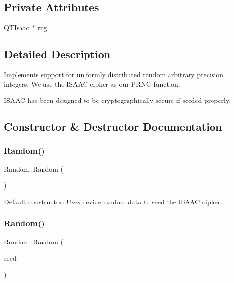 \subsection*{Private Attributes}
\begin{DoxyCompactItemize}
\item 
\hyperlink{classQTIsaac}{Q\+T\+Isaac} $\ast$ \hyperlink{classRandom_ac7e446b9b431641c729a6d78ab747781}{rng}
\end{DoxyCompactItemize}


\subsection{Detailed Description}
Implements support for uniformly distributed random arbitrary precision integers. We use the I\+S\+A\+AC cipher as our P\+R\+NG function.

I\+S\+A\+AC has been designed to be cryptographically secure if seeded properly. 

\subsection{Constructor \& Destructor Documentation}
\mbox{\label{classRandom_acb76b49c3903a3c4fb67fd216341f08d}} 
\subsubsection{\texorpdfstring{Random()}{Random()}\hspace{0.1cm}{\footnotesize\ttfamily [1/2]}}
{\footnotesize\ttfamily Random\+::\+Random (\begin{DoxyParamCaption}{ }\end{DoxyParamCaption})}

Default constructor. Uses device random data to seed the I\+S\+A\+AC cipher. \mbox{\label{classRandom_a828e4af348ebff33c0785980a4ff4d38}} 
\subsubsection{\texorpdfstring{Random()}{Random()}\hspace{0.1cm}{\footnotesize\ttfamily [2/2]}}
{\footnotesize\ttfamily Random\+::\+Random (\begin{DoxyParamCaption}\item[{Crypto\+P\+P\+::\+Sec\+Byte\+Block \&}]{seed }\end{DoxyParamCaption})}


